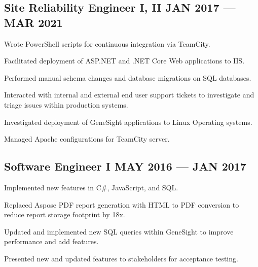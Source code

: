 \subsection{{Site Reliability Engineer I, II \hfill JAN 2017 --- MAR 2021}}
\begin{zitemize}
\item Wrote PowerShell scripts for continuous integration via TeamCity.
\item Facilitated deployment of ASP.NET and .NET Core Web applications to IIS.
\item Performed manual schema changes and database migrations on SQL databases.
\item Interacted with internal and external end user support tickets to investigate and triage issues within production systems.
\item Investigated deployment of GeneSight applications to Linux Operating systems.
\item Managed Apache configurations for TeamCity server.
\end{zitemize}

\subsection{{Software Engineer I \hfill MAY 2016 --- JAN 2017}}
\begin{zitemize}
\item Implemented new features in C\#, JavaScript, and SQL.
\item Replaced Aspose PDF report generation with HTML to PDF conversion to reduce report storage footprint by 18x.
\item Updated and implemented new SQL queries within GeneSight to improve performance and add features.
\item Presented new and updated features to stakeholders for acceptance testing.
\end{zitemize}